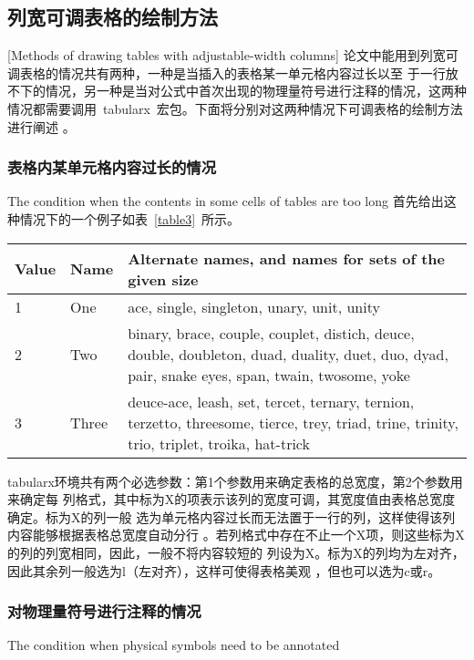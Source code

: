 \subsection{列宽可调表格的绘制方法}[Methods of drawing tables with adjustable-width columns]
论文中能用到列宽可调表格的情况共有两种，一种是当插入的表格某一单元格内容过长以至
于一行放不下的情况，另一种是当对公式中首次出现的物理量符号进行注释的情况，这两种
情况都需要调用~tabularx~宏包。下面将分别对这两种情况下可调表格的绘制方法进行阐述
。
\subsubsection{表格内某单元格内容过长的情况}{The condition when the contents in some cells of tables are too long}
首先给出这种情况下的一个例子如表~\ref{table3}~所示。
\begin{table}[htbp]
  \centering
{}\vspace{0.5em}\wuhao
\begin{tabularx}{0.7\textwidth}{llX}
\toprule[1.5pt]
Value & Name & Alternate names, and names for sets of the given size\\\midrule[1pt]
1 & One & ace, single, singleton, unary, unit, unity\\
2 & Two & binary, brace, couple, couplet, distich, deuce, double, doubleton, duad, duality, duet, duo, dyad, pair, snake eyes, span, twain, twosome, yoke\\
3 & Three & deuce-ace, leash, set, tercet, ternary, ternion, terzetto, threesome, tierce, trey, triad, trine, trinity, trio, triplet, troika, hat-trick\\\bottomrule[1.5pt]
\end{tabularx}
\end{table}
tabularx环境共有两个必选参数：第1个参数用来确定表格的总宽度，第2个参数用来确定每
列格式，其中标为X的项表示该列的宽度可调，其宽度值由表格总宽度确定。标为X的列一般
选为单元格内容过长而无法置于一行的列，这样使得该列内容能够根据表格总宽度自动分行
。若列格式中存在不止一个X项，则这些标为X的列的列宽相同，因此，一般不将内容较短的
列设为X。标为X的列均为左对齐，因此其余列一般选为l（左对齐），这样可使得表格美观
，但也可以选为c或r。

\subsubsection{对物理量符号进行注释的情况}{The condition when physical symbols need to be annotated}

